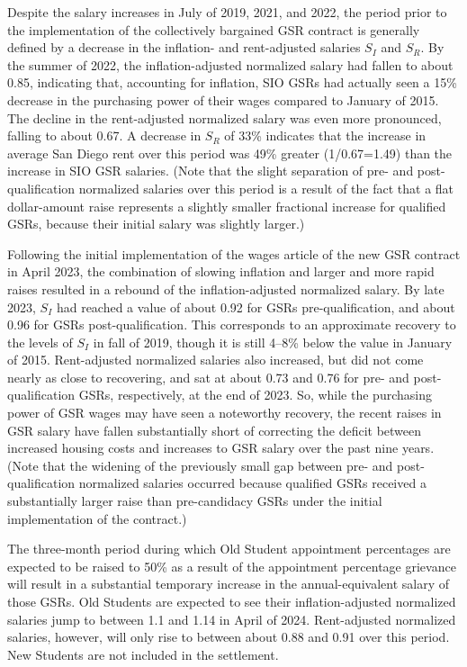 \documentclass{article}
\begin{document}
Despite the salary increases in July of 2019, 2021, and 2022, the period prior to the implementation of the collectively bargained GSR contract is generally defined by a decrease in the inflation- and rent-adjusted salaries $S_I$ and $S_R$. By the summer of 2022, the inflation-adjusted normalized salary had fallen to about 0.85, indicating that, accounting for inflation, SIO GSRs had actually seen a 15\% decrease in the purchasing power of their wages compared to January of 2015. The decline in the rent-adjusted normalized salary was even more pronounced, falling to about 0.67. A decrease in $S_R$ of 33\% indicates that the increase in average San Diego rent over this period was 49\% greater (1/0.67=1.49) than the increase in SIO GSR salaries. (Note that the slight separation of pre- and post-qualification normalized salaries over this period is a result of the fact that a flat dollar-amount raise represents a slightly smaller fractional increase for qualified GSRs, because their initial salary was slightly larger.)

Following the initial implementation of the wages article of the new GSR contract in April 2023, the combination of slowing inflation and larger and more rapid raises resulted in a rebound of the inflation-adjusted normalized salary. By late 2023, $S_I$ had reached a value of about 0.92 for GSRs pre-qualification, and about 0.96 for GSRs post-qualification. This corresponds to an approximate recovery to the levels of $S_I$ in fall of 2019, though it is still 4--8\% below the value in January of 2015. Rent-adjusted normalized salaries also increased, but did not come nearly as close to recovering, and sat at about 0.73 and 0.76 for pre- and post-qualification GSRs, respectively, at the end of 2023. So, while the purchasing power of GSR wages may have seen a noteworthy recovery, the recent raises in GSR salary have fallen substantially short of correcting the deficit between increased housing costs and increases to GSR salary over the past nine years. (Note that the widening of the previously small gap between pre- and post-qualification normalized salaries occurred because qualified GSRs received a substantially larger raise than pre-candidacy GSRs under the initial implementation of the contract.)

The three-month period during which Old Student appointment percentages are expected to be raised to 50\% as a result of the appointment percentage grievance will result in a substantial temporary increase in the annual-equivalent salary of those GSRs. Old Students are expected to see their inflation-adjusted normalized salaries jump to between 1.1 and 1.14 in April of 2024. Rent-adjusted normalized salaries, however, will only rise to between about 0.88 and 0.91 over this period. New Students are not included in the settlement.
\end{document}
